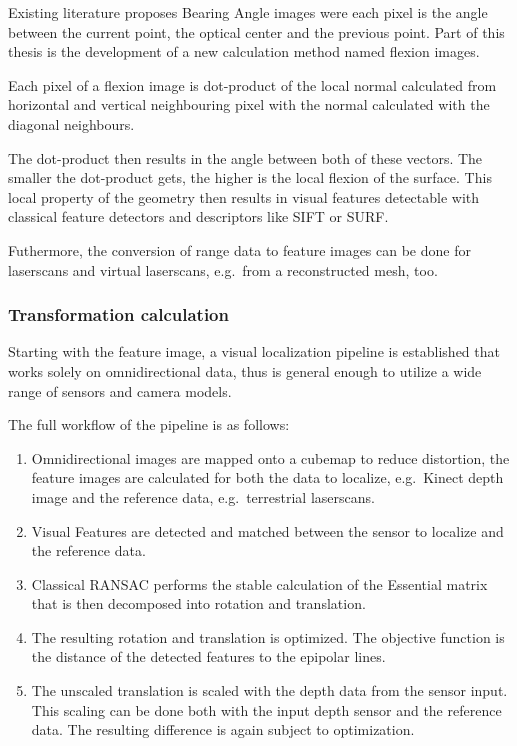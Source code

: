 \documentclass[doktyp=marbeit,fontsize=12pt,sprache=english,draft=true,hausschrift=true]{TUBAFarbeiten}
\begin{document}
Existing literature proposes Bearing Angle images were each pixel is the
angle between the current point, the optical center and the previous
point. Part of this thesis is the development of a new calculation
method named flexion images.

Each pixel of a flexion image is dot-product of the local normal
calculated from horizontal and vertical neighbouring pixel with the
normal calculated with the diagonal neighbours.

The dot-product then results in the angle between both of these vectors.
The smaller the dot-product gets, the higher is the local flexion of the
surface. This local property of the geometry then results in visual
features detectable with classical feature detectors and descriptors like
\gls{SIFT} or \gls{SURF}.

Futhermore, the conversion of range data to feature images can be done
for laserscans and virtual laserscans, e.g.~from a reconstructed mesh,
too.

\subsubsection{Transformation calculation}\label{transformation-calculation}

Starting with the feature image, a visual localization pipeline is
established that works solely on omnidirectional data, thus is general
enough to utilize a wide range of sensors and camera models.

The full workflow of the pipeline is as follows:

\begin{enumerate}
\item Omnidirectional images are mapped onto a cubemap to reduce distortion,
  the feature images are calculated for both the data to localize,
  e.g.~Kinect depth image and the reference data, e.g.~terrestrial
  laserscans.
\item Visual Features are detected and matched between the sensor to
  localize and the reference data.
\item Classical RANSAC performs the stable calculation of the
  Essential matrix that is then decomposed into rotation and translation.
\item The resulting rotation and translation is optimized. The objective
  function is the distance of the detected features to the epipolar
  lines.
\item The unscaled translation is scaled with the depth data from the sensor
  input. This scaling can be done both with the input depth sensor and
  the reference data. The resulting difference is again subject to
  optimization.
\end{enumerate}
\end{document}
